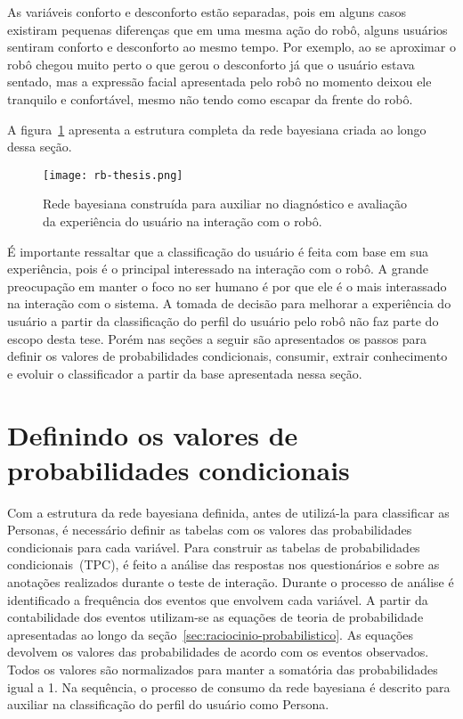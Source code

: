 As variáveis conforto e desconforto estão separadas, pois em alguns casos existiram pequenas diferenças que em uma mesma ação do robô, alguns usuários sentiram conforto e desconforto ao mesmo tempo. Por exemplo, ao se aproximar o robô chegou muito perto o que gerou o desconforto já que o usuário estava sentado, mas a expressão facial apresentada pelo robô no momento deixou ele tranquilo e confortável, mesmo não tendo como escapar da frente do robô.

A figura~\ref{fig:rb} apresenta a estrutura completa da rede bayesiana criada ao longo dessa seção.

\begin{figure}[ht!]
	\centering
	\begin{minipage}{\textwidth}
		\caption{Rede bayesiana construída para auxiliar no diagnóstico e avaliação da experiência do usuário na interação com o robô.}
		\texttt{[image: rb-thesis.png]}
		\label{fig:rb}
	\end{minipage}
\end{figure}

É importante ressaltar que a classificação do usuário é feita com base em sua experiência, pois é o principal interessado na interação com o robô. A grande preocupação em manter o foco no ser humano é por que ele é o mais interassado na interação com o sistema. A tomada de decisão para melhorar a experiência do usuário a partir da classificação do perfil do usuário pelo robô não faz parte do escopo desta tese. Porém nas seções a seguir são apresentados os passos para definir os valores de probabilidades condicionais, consumir, extrair conhecimento e evoluir o classificador a partir da base apresentada nessa seção.

\section{Definindo os valores de probabilidades condicionais}
\label{sec:tpc}
Com a estrutura da rede bayesiana definida, antes de utilizá-la para classificar as Personas, é necessário definir as tabelas com os valores das probabilidades condicionais para cada variável. Para construir as tabelas de probabilidades condicionais~(TPC), é feito a análise das respostas nos questionários e sobre as anotações realizados durante o teste de interação. Durante o processo de análise é identificado a frequência dos eventos que envolvem cada variável. A partir da contabilidade dos eventos utilizam-se as equações de teoria de probabilidade apresentadas ao longo da seção~\ref{sec:raciocinio-probabilistico}. As equações devolvem os valores das probabilidades de acordo com os eventos observados. Todos os valores são normalizados para manter a somatória das probabilidades igual a 1. Na sequência, o processo de consumo da rede bayesiana é descrito para auxiliar na classificação do perfil do usuário como Persona.

